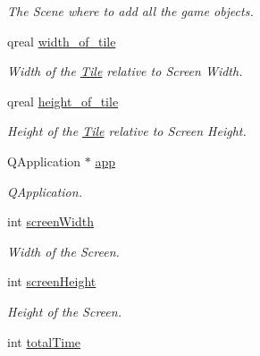 \begin{DoxyCompactItemize}
\begin{DoxyCompactList}\small\item\em The Scene where to add all the game objects. \end{DoxyCompactList}\item 
\hypertarget{classReadInput_ac37f50f8dccc35548092fc547a696e8b}{qreal \hyperlink{classReadInput_ac37f50f8dccc35548092fc547a696e8b}{width\-\_\-of\-\_\-tile}}\label{classReadInput_ac37f50f8dccc35548092fc547a696e8b}

\begin{DoxyCompactList}\small\item\em Width of the \hyperlink{classTile}{Tile} relative to Screen Width. \end{DoxyCompactList}\item 
\hypertarget{classReadInput_a5f2147dd5ccbcfcd0bda7ad4a4223806}{qreal \hyperlink{classReadInput_a5f2147dd5ccbcfcd0bda7ad4a4223806}{height\-\_\-of\-\_\-tile}}\label{classReadInput_a5f2147dd5ccbcfcd0bda7ad4a4223806}

\begin{DoxyCompactList}\small\item\em Height of the \hyperlink{classTile}{Tile} relative to Screen Height. \end{DoxyCompactList}\item 
\hypertarget{classReadInput_a110330967ab2d06e89240eff7b933f9d}{Q\-Application $\ast$ \hyperlink{classReadInput_a110330967ab2d06e89240eff7b933f9d}{app}}\label{classReadInput_a110330967ab2d06e89240eff7b933f9d}

\begin{DoxyCompactList}\small\item\em Q\-Application. \end{DoxyCompactList}\item 
\hypertarget{classReadInput_abdeefb04b7789d19ef130522fa8eacf8}{int \hyperlink{classReadInput_abdeefb04b7789d19ef130522fa8eacf8}{screen\-Width}}\label{classReadInput_abdeefb04b7789d19ef130522fa8eacf8}

\begin{DoxyCompactList}\small\item\em Width of the Screen. \end{DoxyCompactList}\item 
\hypertarget{classReadInput_a0d6a1690d18753353603622b8ab0e99c}{int \hyperlink{classReadInput_a0d6a1690d18753353603622b8ab0e99c}{screen\-Height}}\label{classReadInput_a0d6a1690d18753353603622b8ab0e99c}

\begin{DoxyCompactList}\small\item\em Height of the Screen. \end{DoxyCompactList}\item 
\hypertarget{classReadInput_a4b07fa90c576175ceb01f7e87e7ffd96}{int \hyperlink{classReadInput_a4b07fa90c576175ceb01f7e87e7ffd96}{total\-Time}}\label{classReadInput_a4b07fa90c576175ceb01f7e87e7ffd96}


\end{DoxyCompactItemize}
